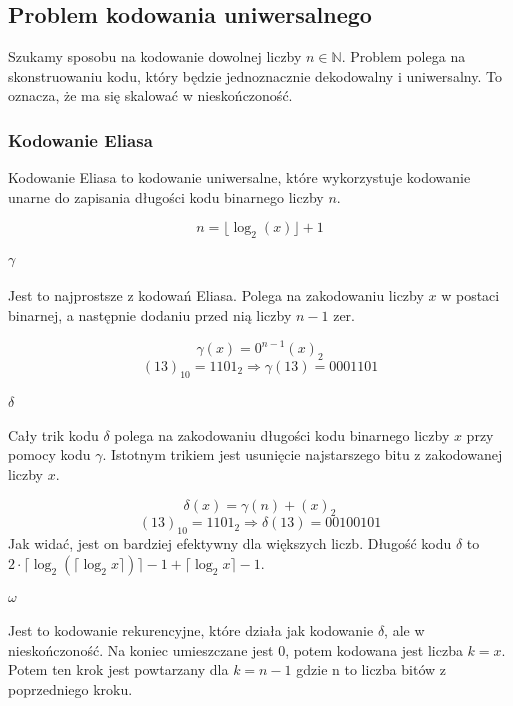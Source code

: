 \documentclass{../notatki}
\begin{document}
\subsection{Problem kodowania uniwersalnego}

Szukamy sposobu na kodowanie dowolnej liczby $n \in \mathbb{N}$.
Problem polega
na skonstruowaniu kodu, który będzie jednoznacznie dekodowalny i uniwersalny.
To oznacza, że ma się skalować w nieskończoność.

\subsubsection{Kodowanie Eliasa}

Kodowanie Eliasa to kodowanie uniwersalne, które wykorzystuje kodowanie unarne
do zapisania długości kodu binarnego liczby $n$.

$$
n = \lfloor \log_2(x) \rfloor + 1
$$

\paragraph{$\gamma$}

Jest to najprostsze z kodowań Eliasa. Polega na zakodowaniu liczby $x$ w
postaci binarnej, a następnie dodaniu przed nią liczby $n-1$ zer.

$$
\gamma(x) = 0^{n-1}(x)_2
$$
$$
(13)_{10} = 1101_2 \Rightarrow \gamma(13) = 0001101
$$

\paragraph{$\delta$}

Cały trik kodu $\delta$ polega na zakodowaniu długości kodu binarnego liczby
$x$ przy pomocy kodu $\gamma$.
Istotnym trikiem jest usunięcie najstarszego bitu z zakodowanej liczby $x$.

$$
\delta(x) = \gamma(n) + (x)_2
$$
$$
(13)_{10} = 1101_2 \Rightarrow \delta(13) = 00 100 101
$$
Jak widać, jest on bardziej efektywny dla większych liczb. Długość kodu
$\delta$ to $2 \cdot \lceil \log_2(\lceil \log_2x \rceil)\rceil - 1 +
\lceil \log_2x \rceil - 1$.

\paragraph{$\omega$}

Jest to kodowanie rekurencyjne, które działa jak kodowanie $\delta$, ale
w nieskończoność.
Na koniec umieszczane jest $0$, potem kodowana jest liczba $k=x$. Potem ten
krok jest powtarzany dla $k=n - 1$ gdzie n to liczba bitów z
poprzedniego kroku.
\end{document}
